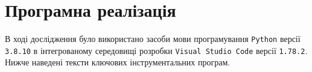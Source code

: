 \documentclass{mathreport}
\begin{document}

\newpage
\section*{Програмна реалізація}

В ході дослідження було використано засоби мови програмування \texttt{Python} версії \texttt{3.8.10} в інтегрованому середовищі розробки \texttt{Visual Studio Code} версії \texttt{1.78.2}. Нижче наведені тексти ключових інструментальних програм.










\end{document}
